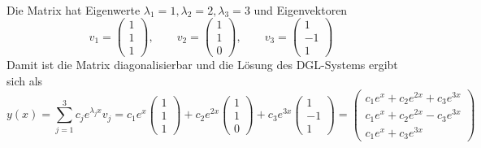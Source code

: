 \documentclass{mywork}
\begin{document}
\newpage

\begin{aufgabe}~

	Die Matrix hat Eigenwerte $\lambda_1 = 1, \lambda_2 = 2, \lambda_3 = 3$ und Eigenvektoren
	\[
		v_1 = \begin{pmatrix}
			1 \\ 1 \\ 1
		\end{pmatrix}, \qquad
		v_2 = \begin{pmatrix}
			1 \\ 1 \\ 0
		\end{pmatrix}, \qquad
		v_3 = \begin{pmatrix}
			1 \\ -1 \\ 1
		\end{pmatrix}
	\]
	Damit ist die Matrix diagonalisierbar und die Lösung des DGL-Systems ergibt sich als
	\[
		y(x) 
		= \sum_{j=1}^3 c_j e^{\lambda_j x}v_j
		= c_1 e^x \begin{pmatrix}
			1 \\ 1 \\ 1
		\end{pmatrix} + c_2 e^{2x} \begin{pmatrix}
			1 \\ 1 \\ 0
		\end{pmatrix} + c_3 e^{3x} \begin{pmatrix}
			1 \\ -1 \\ 1
		\end{pmatrix}
		= \begin{pmatrix}
			c_1 e^x + c_2 e^{2x} + c_3 e^{3x} \\
			c_1 e^x + c_2 e^{2x} - c_3 e^{3x} \\
			c_1 e^x + c_3 e^{3x}
		\end{pmatrix}
	\]
\end{aufgabe}
\end{document}
